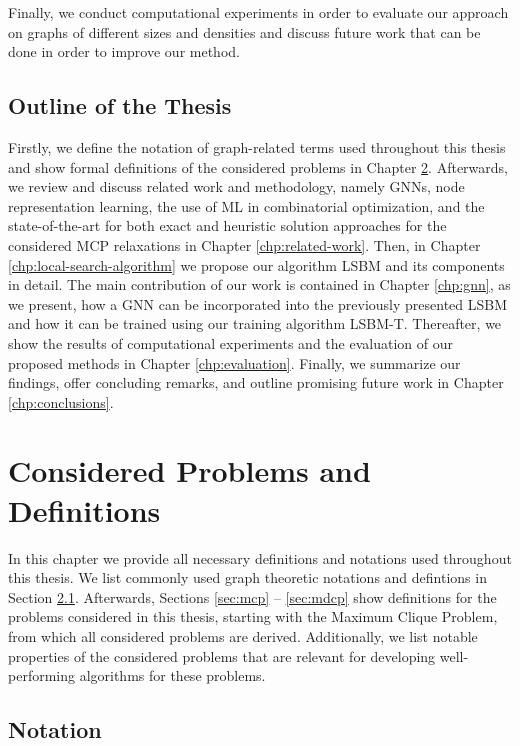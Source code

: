 \documentclass[draft,final]{vutinfth} %
\begin{document}
Finally, we conduct computational experiments in order to evaluate our approach on graphs of different sizes and densities and discuss future work that can be done in order to improve our method. 

\section{Outline of the Thesis}\label{sec:outline}
Firstly, we define the notation of graph-related terms used throughout this thesis and show formal definitions of the considered problems in Chapter \ref{chp:problems-definitions}. 
Afterwards, we review and discuss related work and methodology, namely GNNs, node representation learning, the use of ML in combinatorial optimization, and the state-of-the-art for both exact and heuristic solution approaches for the considered MCP relaxations in Chapter \ref{chp:related-work}. 
Then, in Chapter \ref{chp:local-search-algorithm} we propose our algorithm LSBM and its components in detail. The main contribution of our work is contained in Chapter \ref{chp:gnn}, as we present, how a GNN can be incorporated into the previously presented LSBM and how it can be trained using our training algorithm LSBM-T. Thereafter, we show the results of computational experiments and the evaluation of our proposed methods in Chapter \ref{chp:evaluation}. Finally, we summarize our findings, offer concluding remarks, and outline promising future work in Chapter \ref{chp:conclusions}. 

\chapter{Considered Problems and Definitions}\label{chp:problems-definitions}

In this chapter we provide all necessary definitions and notations used throughout this thesis. We list commonly used graph theoretic notations and defintions in Section \ref{sec:notation}. Afterwards, Sections \ref{sec:mcp} -- \ref{sec:mdcp} show definitions for the problems considered in this thesis, starting with the Maximum Clique Problem, from which all considered problems are derived. Additionally, we list notable properties of the considered problems that are relevant for developing well-performing algorithms for these problems. 

\section{Notation}\label{sec:notation}
\end{document}
